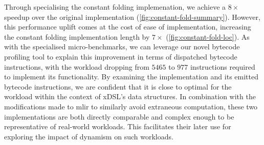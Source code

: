 Through specialising the constant folding implemenation, we achieve a $8\times$ speedup over the original implementation (\autoref{fig:constant-fold-summary}).
However, this performance uplift comes at the cost of ease of implementation, increasing the constant folding implementation length by $7\times$ (\autoref{fig:constant-fold-loc}).
As with the specialised micro-benchmarks, we can leverage our novel bytecode profiling tool to explain this improvement in terms of dispatched bytecode instructions, with the workload dropping from $5465$ to $977$ instructions required to implement its functionality.
By examining the implementation and its emitted bytecode instructions, we are confident that it is close to optimal for the workload within the context of xDSL's data structures.
In combination with the modifications made to \ac{mlir} to similarly avoid extraneous computation, these two implementations are both directly comparable and complex enough to be representative of real-world workloads.
This facilitates their later use for exploring the impact of dynamism on such workloads.




